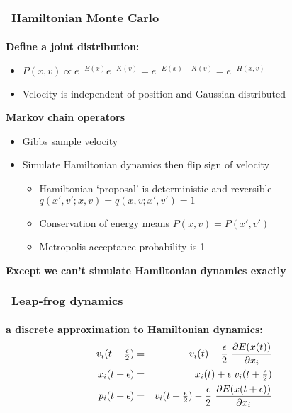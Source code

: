 \documentclass[25pt,landscape]{foils}
\newcommand{\Gray}{\textcolor{mygray}}
\newcommand{\Green}{\textcolor{mypine}}
\newcommand{\myfoilhead}[1]{
\newpage
\vspace*{-1cm}
\Gray{
\begin{tabular*}{\textwidth}{l}
{\bf \Huge #1} \\
\bottomrule
\end{tabular*}}}
\begin{document}
\myfoilhead{Hamiltonian Monte Carlo}

\vfill

\Green{\bf Define a joint distribution:}
\begin{itemize}
    \setlength{\itemsep}{5pt}
    \setlength{\parskip}{5pt}
    \setlength{\parsep}{0cm}
    \item $P(x,v) \propto e^{-E(x)}e^{-K(v)} = e^{-E(x)-K(v)} = e^{-H(x,v)}$
    \item Velocity is independent of position and Gaussian distributed
\end{itemize}

\vfill

\Green{\bf Markov chain operators}
\begin{itemize}
    \setlength{\itemsep}{5pt}
    \setlength{\parskip}{5pt}
    \setlength{\parsep}{0cm}
    \item Gibbs sample velocity
    \item Simulate Hamiltonian dynamics then flip sign of velocity
    \begin{itemize}
        \item Hamiltonian `proposal' is deterministic and reversible\\$q(x',v';x,v)=q(x,v;x',v')=1$
        \item Conservation of energy means $P(x,v)=P(x',v')$
        \item Metropolis acceptance probability is 1
    \end{itemize}
\end{itemize}

\vfill

\Green{\bf Except we can't simulate Hamiltonian dynamics exactly}


\myfoilhead{Leap-frog dynamics}

\vfill

\Green{\bf a discrete approximation to Hamiltonian dynamics:}
\begin{eqnarray*}
    v_i(t+{\textstyle \frac{\epsilon}{2}}) & = & v_i(t) -
\frac{\epsilon}{2}\ \frac{\partial E(x(t))}{\partial x_i}\\
x_i(t+\epsilon) & = & x_i(t) +
\epsilon\kern3pt v_i(t+{\textstyle \frac{\epsilon}{2}})\\
p_i(t+\epsilon) & = & v_i(t+{\textstyle \frac{\epsilon}{2}}) -
\frac{\epsilon}{2}\ \frac{\partial E(x(t+\epsilon))}{\partial x_i}
\end{eqnarray*}
\end{document}
